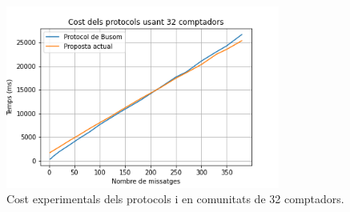 \begin{figure}[H]
	\centering
	\includegraphics[width=9cm]{imgs/cost/32compt.png}
	\caption{Cost experimentals dels protocols \cite{recsi} i \cite{busom} en comunitats de 32 comptadors.}
	\label{fig:prottime32}
\end{figure}

